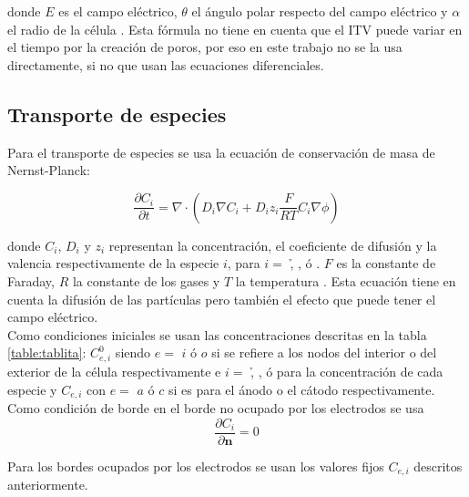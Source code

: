 \documentclass[a4paper,10pt]{article}
\begin{document}
donde $E$ es el campo eléctrico, $\theta$ el ángulo polar respecto del campo eléctrico y $\alpha$ el radio de la célula \cite{puchiar}. Esta fórmula no tiene en cuenta que el ITV puede variar en el tiempo por la creación de poros, por eso en este trabajo no se la usa directamente, si no que usan las ecuaciones diferenciales. 

\subsection{Transporte de especies}
Para el transporte de especies se usa la ecuación de conservación de masa de Nernst-Planck:

\begin{equation} \label{eq:trans}
	\frac{\partial C_i}{\partial t} = \nabla \cdot \left( D_i \nabla C_i + D_i z_i \frac{F}{R T} C_i \nabla \phi \right)
\end{equation}

donde $C_i$, $D_i$ y $z_i$ representan la concentración, el coeficiente de difusión y la valencia 
respectivamente de la especie $i$, para $i = $ \h, \oh, \na ó \cl.
$F$ es la constante de Faraday, $R$ la constante de los gases y $T$ la temperatura \cite{fodava}. 
Esta ecuación tiene en cuenta la difusión de las partículas pero también el efecto que puede tener el campo eléctrico.\\

Como condiciones iniciales se usan las concentraciones descritas en la tabla \ref{table:tablita}: $C_{e, i}^0$ siendo $e =$ $i$ ó $o$ si se refiere a los nodos del interior o del exterior de la célula respectivamente e $i =$ \h, \oh, \na ó \cl para la concentración de cada especie y $C_{e,i}$ con $e =$ $a$ ó $c$ si es para el ánodo o el cátodo respectivamente.\\

Como condición de borde en el borde no ocupado por los electrodos se usa
\begin{equation}
	\frac{\partial C_i}{\partial \mathbf{n}} = 0
\end{equation}

Para los bordes ocupados por los electrodos se usan los valores fijos $C_{e,i}$ descritos anteriormente.

\end{document}
